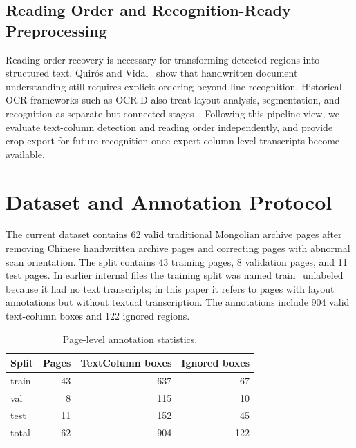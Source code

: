 \documentclass[12pt]{article}
\begin{document}
\subsection{Reading Order and Recognition-Ready Preprocessing}
Reading-order recovery is necessary for transforming detected regions into structured text. Quir\'os and Vidal~\cite{quiros2022reading} show that handwritten document understanding still requires explicit ordering beyond line recognition. Historical OCR frameworks such as OCR-D also treat layout analysis, segmentation, and recognition as separate but connected stages~\cite{neudecker2019ocrd}. Following this pipeline view, we evaluate text-column detection and reading order independently, and provide crop export for future recognition once expert column-level transcripts become available.

\section{Dataset and Annotation Protocol}
The current dataset contains 62 valid traditional Mongolian archive pages after removing Chinese handwritten archive pages and correcting pages with abnormal scan orientation. The split contains 43 training pages, 8 validation pages, and 11 test pages. In earlier internal files the training split was named train\_unlabeled because it had no text transcripts; in this paper it refers to pages with layout annotations but without textual transcription. The annotations include 904 valid text-column boxes and 122 ignored regions.

\begin{table}[t]
\centering
\caption{Page-level annotation statistics.}
\label{tab:data_stats}
\begin{tabular}{lrrr}
\toprule
Split & Pages & TextColumn boxes & Ignored boxes \\
\midrule
train & 43 & 637 & 67 \\
val & 8 & 115 & 10 \\
test & 11 & 152 & 45 \\
\midrule
total & 62 & 904 & 122 \\
\bottomrule
\end{tabular}
\end{table}
\end{document}
